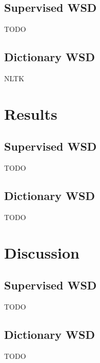 \documentclass[11pt]{article}
\begin{document}
\subsection{Supervised WSD}
TODO

\subsection{Dictionary WSD}
NLTK


\section{Results}
\subsection{Supervised WSD}
TODO

\subsection{Dictionary WSD}
TODO

\section{Discussion}
\subsection{Supervised WSD}
TODO

\subsection{Dictionary WSD}
TODO
\end{document}
